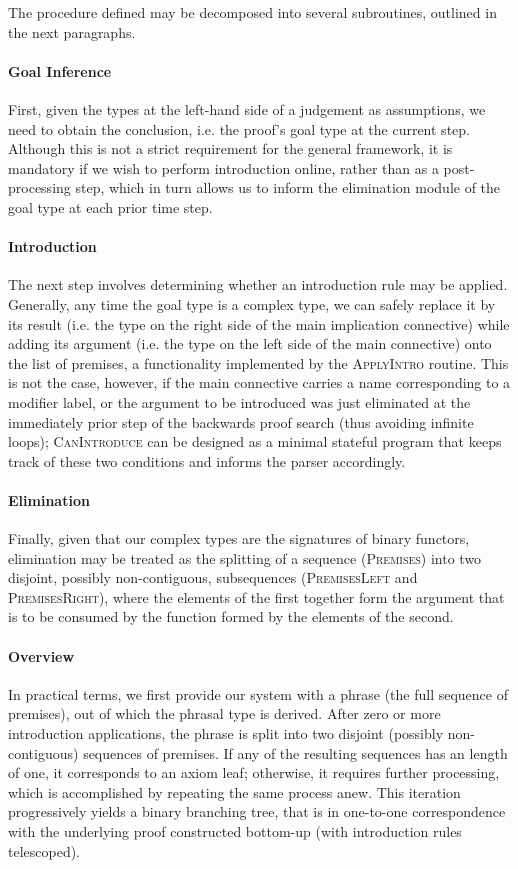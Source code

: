 The procedure defined may be decomposed into several subroutines, outlined in the next paragraphs.

\paragraph{Goal Inference}
First, given the types at the left-hand side of a judgement as assumptions, we need to obtain the conclusion, i.e. the proof's goal type at the current step.
Although this is not a strict requirement for the general framework, it is mandatory if we wish to perform introduction online, rather than as a post-processing step, which in turn allows us to inform the elimination module of the goal type at each prior time step.

\paragraph{Introduction}
The next step involves determining whether an introduction rule may be applied. 
Generally, any time the goal type is a complex type, we can safely replace it by its result (i.e. the type on the right side of the main implication connective) while adding its argument (i.e. the type on the left side of the main connective) onto the list of premises, a functionality implemented by the \textsc{ApplyIntro} routine.
This is not the case, however, if the main connective carries a name corresponding to a modifier label, or the argument to be introduced was just eliminated at the immediately prior step of the backwards proof search (thus avoiding infinite loops); \textsc{CanIntroduce} can be designed as a minimal stateful program that keeps track of these two conditions and informs the parser accordingly.

\paragraph{Elimination}
Finally, given that our complex types are the signatures of binary functors, elimination may be treated as the splitting of a sequence (\textsc{Premises}) into two disjoint, possibly non-contiguous, subsequences (\textsc{PremisesLeft} and \textsc{PremisesRight}), where the elements of the first together form the argument that is to be consumed by the function formed by the elements of the second.

\paragraph{Overview}
In practical terms, we first provide our system with a phrase (the full sequence of premises), out of which the phrasal type is derived.
After zero or more introduction applications, the phrase is split into two disjoint (possibly non-contiguous) sequences of premises.
If any of the resulting sequences has an length of one, it corresponds to an axiom leaf; otherwise, it requires further processing, which is accomplished by repeating the same process anew.
This iteration progressively yields a binary branching tree, that is in one-to-one correspondence with the underlying proof constructed bottom-up (with introduction rules telescoped).

